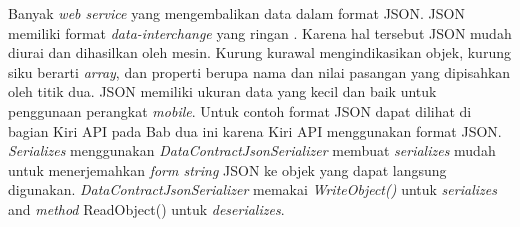 Banyak \textit{web service} yang mengembalikan data dalam format JSON. JSON memiliki format \textit{data-interchange} yang ringan \cite{rfc7159}. Karena hal tersebut JSON mudah diurai dan dihasilkan oleh mesin. Kurung kurawal mengindikasikan objek, kurung siku berarti \textit{array}, dan properti berupa nama dan nilai pasangan yang dipisahkan oleh titik dua. JSON memiliki ukuran data yang kecil dan baik untuk penggunaan perangkat \textit{mobile}. Untuk contoh format JSON dapat dilihat di bagian Kiri API pada Bab dua ini karena Kiri API menggunakan format JSON. \textit{Serializes} menggunakan \textit{DataContractJsonSerializer} membuat \textit{serializes} mudah untuk menerjemahkan \textit{form string} JSON ke objek yang dapat langsung digunakan. \textit{DataContractJsonSerializer} memakai \textit{WriteObject()} untuk \textit{serializes} and \textit{method} ReadObject() untuk \textit{deserializes}.

